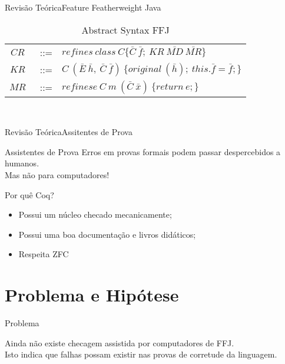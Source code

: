 \documentclass{beamer}
\begin{document}
	\begin{frame}{Revisão Teórica}{Feature Featherweight Java}
	\centering
	\begin{table}[ht!]
		\caption{Abstract Syntax FFJ}
		\begin{tabular}{ccl}
			$CR$&~::= & $refines\ class\ C\{\bar{C} \ \bar{f};\ KR\
			\bar{MD}\ \bar{MR}\}$\\ 
			\vspace{0.8mm}
			$KR$&~::= &
			$C~(\bar{E}~\bar{h},\ \bar{C}~\bar{f})\
			\{original~(\bar{h});~this.\bar{f}=\bar{f};\}$\\
			\vspace{0.8mm}
			$MR$&~::= & $refinese\ C~m~(\bar{C}~\bar{x})\ \{return~e;\}$\\
		\end{tabular} \\
		\vspace{1.5mm}
		\label{abstractsyntax}
	\end{table}
\end{frame}

	
	\begin{frame}{Revisão Teórica}{Assitentes de Prova}
		\centering
		\begin{block}{Assistentes de Prova}
			Erros em provas formais podem passar despercebidos a humanos.\\
			Mas não para computadores!
		\end{block}
		
		\begin{block}{Por quê Coq?}
			\begin{itemize}
				\item Possui um núcleo checado mecanicamente;
				\item Possui uma boa documentação e livros didáticos;
				\item Respeita ZFC
			\end{itemize}
		\end{block}
	\end{frame}

	
	\section{Problema e Hipótese}
	\begin{frame}{Problema}
		\begin{block}{}
			Ainda não existe checagem assistida por computadores de FFJ. \\
			Isto indica que falhas possam existir nas provas de corretude da linguagem.
		\end{block}
	\end{frame}
	
\end{document}
